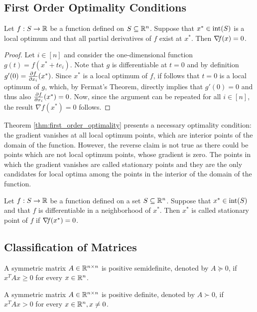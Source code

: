 \documentclass[10pt,a4paper]{article}
\begin{document}
\subsection{First Order Optimality Conditions}
\begin{theorem}\label{thm:first_order_optimality}
	Let $f:S\to \mathbb{R}$ be a function defined on $S\subseteq \mathbb{R}^n$. Suppose that $x^*\in\mathord{\mathrm{int}}(S)$ is a local optimum and that all partial derivatives of $f$ exist at $x^*$. Then $\operatorname*{\mathit{\nabla \!f}}(x)=0$.
\end{theorem}
\begin{proof}
	Let $i\in [n]$ and consider the one-dimensional function $g(t)=f(x^*+te_i)$. Note that $g$ is differentiable at $t=0$ and by definition $g'(0) = \frac{\partial f}{\partial x_i}(x^*)$. Since $x^*$ is a local optimum of $f$, if follows that $t=0$ is a local optimum of $g$, which, by Fermat's Theorem, directly implies that $g'(0) = 0$ and thus also $\frac{\partial f}{\partial x_i}(x^*)=0$. Now, since the argument can be repeated for all $i\in[n]$, the result $\nabla f(x^*) = 0$ follows.
\end{proof}
Theorem \ref{thm:first_order_optimality} presents a necessary optimality condition: the gradient vanishes at all local optimum points, which are interior points of the domain of the function. However, the reverse claim is not true as there could be points which are not local optimum points, whose gradient is zero. The points in which the gradient vanishes are called stationary points and they are the only candidates for local optima among the points in the interior of the domain of the function.
\begin{definition}
	Let $f:S\to \mathbb{R}$ be a function defined on a set $S\subseteq \mathbb{R}^n$. Suppose that $x^* \in \mathord{\mathrm{int}}(S)$ and that $f$ is differentiable in a neighborhood of $x^*$. Then $x^*$ is called stationary point of $f$ if $\operatorname*{\mathit{\nabla \!f}}(x^*)=0$.
\end{definition}
\subsection{Classification of Matrices}
\begin{definition}
	A symmetric matrix $A\in \mathbb{R}^{n\times n}$ is positive semidefinite, denoted by $A \succcurlyeq0$, if $x^TAx\geq 0$ for every $x\in \mathbb{R}^n$.
\end{definition}
\begin{definition}
	A symmetric matrix $A\in \mathbb{R}^{n\times n}$ is positive definite, denoted by $A \succ0$, if $x^TAx> 0$ for every $x\in \mathbb{R}^n, x\neq 0$.
\end{definition}
\end{document}
